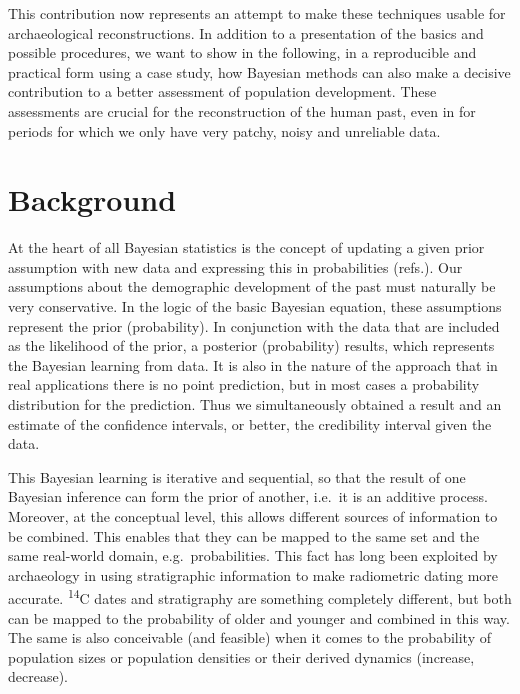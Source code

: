 \documentclass[
]{article}
\begin{document}
This contribution now represents an attempt to make these techniques usable for archaeological reconstructions. In addition to a presentation of the basics and possible procedures, we want to show in the following, in a reproducible and practical form using a case study, how Bayesian methods can also make a decisive contribution to a better assessment of population development. These assessments are crucial for the reconstruction of the human past, even in for periods for which we only have very patchy, noisy and unreliable data.

\hypertarget{background}{%
\section{Background}\label{background}}

At the heart of all Bayesian statistics is the concept of updating a given prior assumption with new data and expressing this in probabilities (refs.). Our assumptions about the demographic development of the past must naturally be very conservative. In the logic of the basic Bayesian equation, these assumptions represent the prior (probability). In conjunction with the data that are included as the likelihood of the prior, a posterior (probability) results, which represents the Bayesian learning from data. It is also in the nature of the approach that in real applications there is no point prediction, but in most cases a probability distribution for the prediction. Thus we simultaneously obtained a result and an estimate of the confidence intervals, or better, the credibility interval given the data.

This Bayesian learning is iterative and sequential, so that the result of one Bayesian inference can form the prior of another, i.e.~it is an additive process. Moreover, at the conceptual level, this allows different sources of information to be combined. This enables that they can be mapped to the same set and the same real-world domain, e.g.~probabilities. This fact has long been exploited by archaeology in using stratigraphic information to make radiometric dating more accurate. \textsuperscript{14}C dates and stratigraphy are something completely different, but both can be mapped to the probability of older and younger and combined in this way. The same is also conceivable (and feasible) when it comes to the probability of population sizes or population densities or their derived dynamics (increase, decrease).
\end{document}
